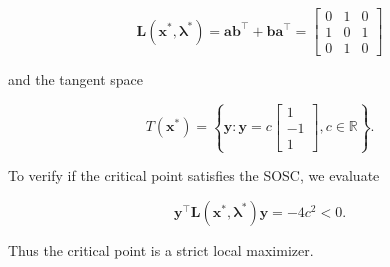 \[
	\boldsymbol{L}\left(\boldsymbol{x}^{*}, \boldsymbol{\lambda}^{*}\right)=\boldsymbol{a} \boldsymbol{b}^{\top}+\boldsymbol{b} \boldsymbol{a}^{\top}=\left[\begin{array}{ccc}
		0 & 1 & 0 \\
		1 & 0 & 1 \\
		0 & 1 & 0
	\end{array}\right]
\]

and the tangent space

\[
	T\left(\boldsymbol{x}^{*}\right)=\left\{\boldsymbol{y}: \boldsymbol{y} = c \left[\begin{array}{c}
		1 \\
		-1 \\
		1
	\end{array}\right], c \in \mathbb{R}\right\} .
\]

To verify if the critical point satisfies the SOSC, we evaluate

\[
	\boldsymbol{y}^{\top} \boldsymbol{L} \left(\boldsymbol{x}^{*}, \boldsymbol{\lambda}^{*}\right) \boldsymbol{y}=-4 c^{2}<0 .
\]

Thus the critical point is a strict local maximizer.
